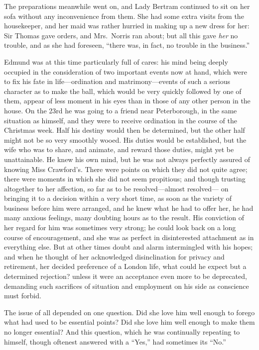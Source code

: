 \documentclass{article}
\begin{document}
The preparations meanwhile went on, and Lady Bertram continued
to sit on her sofa without any inconvenience from them.
She had some extra visits from the housekeeper, and her
maid was rather hurried in making up a new dress for her:
Sir Thomas gave orders, and Mrs.\ Norris ran about;
but all this gave \emph{her} no trouble, and as she had foreseen,
``there was, in fact, no trouble in the business.''

Edmund was at this time particularly full of cares:
his mind being deeply occupied in the consideration of two
important events now at hand, which were to fix his fate
in life---ordination and matrimony---events of such a serious
character as to make the ball, which would be very quickly
followed by one of them, appear of less moment in his
eyes than in those of any other person in the house.
On the 23rd he was going to a friend near Peterborough,
in the same situation as himself, and they were to
receive ordination in the course of the Christmas week.
Half his destiny would then be determined, but the other
half might not be so very smoothly wooed.  His duties would
be established, but the wife who was to share, and animate,
and reward those duties, might yet be unattainable.
He knew his own mind, but he was not always perfectly assured
of knowing Miss Crawford's. There were points on which they
did not quite agree; there were moments in which she did
not seem propitious; and though trusting altogether to
her affection, so far as to be resolved---almost resolved---%
on bringing it to a decision within a very short time,
as soon as the variety of business before him were arranged,
and he knew what he had to offer her, he had many
anxious feelings, many doubting hours as to the result.
His conviction of her regard for him was sometimes very strong;
he could look back on a long course of encouragement,
and she was as perfect in disinterested attachment as
in everything else.  But at other times doubt and alarm
intermingled with his hopes; and when he thought of her
acknowledged disinclination for privacy and retirement,
her decided preference of a London life, what could he expect
but a determined rejection? unless it were an acceptance
even more to be deprecated, demanding such sacrifices
of situation and employment on his side as conscience
must forbid.

The issue of all depended on one question.  Did she
love him well enough to forego what had used to be
essential points?  Did she love him well enough to make
them no longer essential?  And this question, which he
was continually repeating to himself, though oftenest
answered with a ``Yes,'' had sometimes its ``No.''
\end{document}
